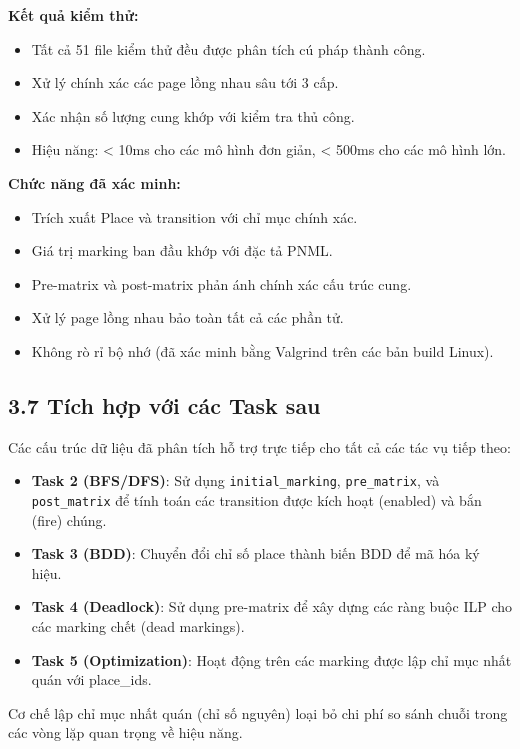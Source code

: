 \documentclass[12pt,a4paper]{article}
\begin{document}
\textbf{Kết quả kiểm thử:}
\begin{itemize}
    \item Tất cả 51 file kiểm thử đều được phân tích cú pháp thành công.
    \item Xử lý chính xác các page lồng nhau sâu tới 3 cấp.
    \item Xác nhận số lượng cung khớp với kiểm tra thủ công.
    \item Hiệu năng: < 10ms cho các mô hình đơn giản, < 500ms cho các mô hình lớn.
\end{itemize}

\textbf{Chức năng đã xác minh:}
\begin{itemize}
    \item Trích xuất Place và transition với chỉ mục chính xác.
    \item Giá trị marking ban đầu khớp với đặc tả PNML.
    \item Pre-matrix và post-matrix phản ánh chính xác cấu trúc cung.
    \item Xử lý page lồng nhau bảo toàn tất cả các phần tử.
    \item Không rò rỉ bộ nhớ (đã xác minh bằng Valgrind trên các bản build Linux).
\end{itemize}

\subsection*{3.7 Tích hợp với các Task sau}

Các cấu trúc dữ liệu đã phân tích hỗ trợ trực tiếp cho tất cả các tác vụ tiếp theo:

\begin{itemize}
    \item \textbf{Task 2 (BFS/DFS)}: Sử dụng \texttt{initial\_marking}, \texttt{pre\_matrix}, và \texttt{post\_matrix} để tính toán các transition được kích hoạt (enabled) và bắn (fire) chúng.
    \item \textbf{Task 3 (BDD)}: Chuyển đổi chỉ số place thành biến BDD để mã hóa ký hiệu.
    \item \textbf{Task 4 (Deadlock)}: Sử dụng pre-matrix để xây dựng các ràng buộc ILP cho các marking chết (dead markings).
    \item \textbf{Task 5 (Optimization)}: Hoạt động trên các marking được lập chỉ mục nhất quán với place\_ids.
\end{itemize}

Cơ chế lập chỉ mục nhất quán (chỉ số nguyên) loại bỏ chi phí so sánh chuỗi trong các vòng lặp quan trọng về hiệu năng.
\end{document}
